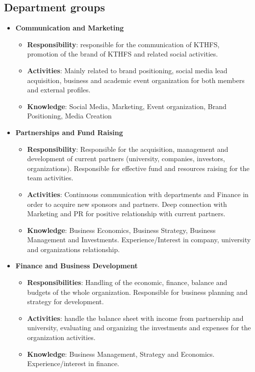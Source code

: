 \documentclass[graybox]{svmult}
\begin{document}
\subsection{Department groups}
\begin{itemize}
    \item \textbf{Communication and Marketing}
    \begin{itemize}
        \item \textbf{Responsibility}: responsible for the communication of KTHFS, promotion of the brand of KTHFS and related social activities.
        \item \textbf{Activities}: Mainly related to brand positioning, social media lead acquisition, business and academic event organization for both members and external profiles.
        \item \textbf{Knowledge}: Social Media, Marketing, Event organization, Brand Positioning, Media Creation
    \end{itemize}
    \item \textbf{Partnerships and Fund Raising}
    \begin{itemize}
        \item \textbf{Responsibility}: Responsible for the acquisition, management and development of current partners (university, companies, investors, organizations). Responsible for effective fund and resources raising for the team activities.
        \item \textbf{Activities}: Continuous communication with departments and Finance in order to acquire new sponsors and partners. Deep connection with Marketing and PR for positive relationship with current partners. 
        \item \textbf{Knowledge}: Business Economics, Business Strategy, Business Management and Investments. Experience/Interest in company, university and organizations relationship.
    \end{itemize}
    \item \textbf{Finance and Business Development}
    \begin{itemize}
        \item \textbf{Responsibilities}: Handling of the economic, finance, balance and budgets of the whole organization. Responsible for business planning and strategy for development. 
        \item \textbf{Activities}: handle the balance sheet with income from partnership and university, evaluating and organizing the investments and expenses for the organization activities.
        \item \textbf{Knowledge}: Business Management, Strategy and Economics. Experience/interest in finance.
    \end{itemize}
\end{itemize}
\end{document}
